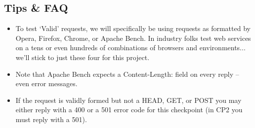 \subsection{Tips \& FAQ}
    \begin{itemize}
      \item To test `Valid' requests, we will specifically be using requests as formatted by Opera, Firefox, Chrome, or Apache Bench. In industry folks test web services on a tens or even hundreds of combinations of browsers and environments... we'll stick to just these four for this project.
      \item Note that Apache Bench expects a Content-Length: field on every reply -- even error messages.
      \item If the request is validly formed but not a HEAD, GET, or POST you may either reply with a 400 or a 501 error code for this checkpoint (in CP2 you must reply with a 501).
    \end{itemize}

\newpage
